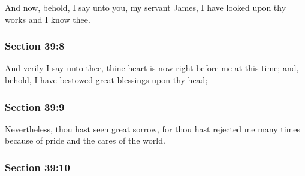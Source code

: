 		And now, behold, I say unto you, my servant James, I have looked upon thy works and I know thee.


	\subsubsection{Section 39:8} %
		\label{DC39-8}

		And verily I say unto thee, thine heart is now right before me at this time; and, behold, I have bestowed great blessings upon thy head;


	\subsubsection{Section 39:9} %
		\label{DC39-9}

		Nevertheless, thou hast seen great sorrow, for thou hast rejected me many times because of pride and the cares of the world.


	\subsubsection{Section 39:10} %
		\label{DC39-10}

